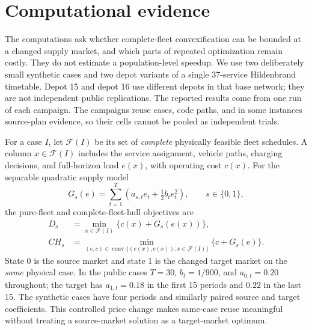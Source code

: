 \section{Computational evidence}\label{sec:computational}

The computations ask whether complete-fleet convexification can be bounded at a changed supply market, and which parts of repeated optimization remain costly.  They do not estimate a population-level speedup.  We use two deliberately small synthetic cases and two depot variants of a single 37-service Hildenbrand timetable.  Depot 15 and depot 16 use different depots in that base network; they are not independent public replications.  The reported results come from one run of each campaign.  The campaigns reuse cases, code paths, and in some instances source-plan evidence, so their cells cannot be pooled as independent trials.

For a case $I$, let $\mathcal F(I)$ be its set of \emph{complete} physically feasible fleet schedules.  A column $x\in\mathcal F(I)$ includes the service assignment, vehicle paths, charging decisions, and full-horizon load $e(x)$, with operating cost $c(x)$.  For the separable quadratic supply model
\begin{equation}\label{eq:computational-supply}
 G_s(e)=\sum_{t=1}^{T}\left(a_{s,t}e_t+\tfrac12 b_t e_t^2\right),\qquad s\in\{0,1\},
\end{equation}
the pure-fleet and complete-fleet-hull objectives are
\begin{equation}\label{eq:computational-D-CH}
\begin{aligned}
 D_s&=\min_{x\in\mathcal F(I)}\{c(x)+G_s(e(x))\},\\
 CH_s&=\min_{(e,c)\in\operatorname{conv}\{(e(x),c(x)):x\in\mathcal F(I)\}}\{c+G_s(e)\}.
\end{aligned}
\end{equation}
State 0 is the source market and state 1 is the changed target market on the \emph{same} physical case.  In the public cases $T=30$, $b_t=1/900$, and $a_{0,t}=0.20$ throughout; the target has $a_{1,t}=0.18$ in the first 15 periods and $0.22$ in the last 15.  The synthetic cases have four periods and similarly paired source and target coefficients.  This controlled price change makes same-case reuse meaningful without treating a source-market solution as a target-market optimum.


